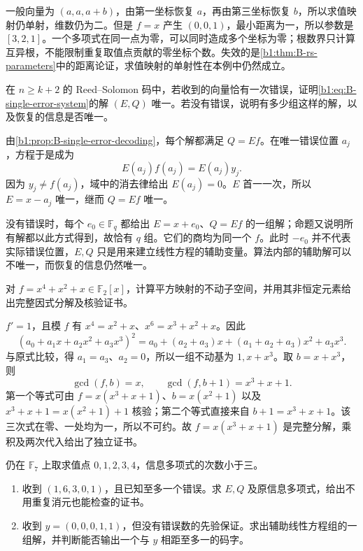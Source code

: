 \begin{solution}
	一般向量为 \((a,a,a+b)\)，由第一坐标恢复 \(a\)，再由第三坐标恢复 \(b\)，所以求值映射仍单射，维数仍为二。但是 \(f=x\) 产生 \((0,0,1)\)，最小距离为一，所以参数是 \([3,2,1]\)。一个多项式在同一点为零，可以同时造成多个坐标为零；根数界只计算互异根，不能限制重复取值点贡献的零坐标个数。失效的是\cref{b1:thm:B-rs-parameters}中的距离论证，求值映射的单射性在本例中仍然成立。
\end{solution}

\begin{exercise}\label{b1:ex:B-decoder-uniqueness}
	在 \(n\geq k+2\) 的 Reed–Solomon 码中，若收到的向量恰有一次错误，证明\eqref{b1:eq:B-single-error-system}的解 \((E,Q)\) 唯一。若没有错误，说明有多少组这样的解，以及恢复的信息是否唯一。
\end{exercise}

\begin{solution}
	由\cref{b1:prop:B-single-error-decoding}，每个解都满足 \(Q=Ef\)。在唯一错误位置 \(a_j\)，方程于是成为
	\[
		E(a_j)f(a_j)=E(a_j)y_j.
	\]
	因为 \(y_j\ne f(a_j)\)，域中的消去律给出 \(E(a_j)=0\)。\(E\) 首一一次，所以 \(E=x-a_j\) 唯一，继而 \(Q=Ef\) 唯一。

	没有错误时，每个 \(e_0\in\mathbb F_q\) 都给出 \(E=x+e_0\)、\(Q=Ef\) 的一组解；命题又说明所有解都以此方式得到，故恰有 \(q\) 组。它们的商均为同一个 \(f\)。此时 \(-e_0\) 并不代表实际错误位置，\(E,Q\) 只是用来建立线性方程的辅助变量。算法内部的辅助解可以不唯一，而恢复的信息仍然唯一。
\end{solution}

\begin{exercise}\label{b1:ex:B-factor-certificate}
	对 \(f=x^4+x^2+x\in\mathbb F_2[x]\)，计算平方映射的不动子空间，并用其非恒定元素给出完整因式分解及核验证书。
\end{exercise}

\begin{solution}
	\(f'=1\)，且模 \(f\) 有 \(x^4=x^2+x\)、\(x^6=x^3+x^2+x\)。因此
	\[
		\left(a_0+a_1x+a_2x^2+a_3x^3\right)^2 =a_0+(a_2+a_3)x+(a_1+a_2+a_3)x^2+a_3x^3.
	\]
	与原式比较，得 \(a_1=a_3\)、\(a_2=0\)，所以一组不动基为 \(1,x+x^3\)。取 \(b=x+x^3\)，则
	\[
		\gcd(f,b)=x,\qquad \gcd(f,b+1)=x^3+x+1.
	\]
	第一个等式可由 \(f=x(x^3+x+1)\)、\(b=x(x^2+1)\) 以及 \(x^3+x+1=x(x^2+1)+1\) 核验；第二个等式直接来自 \(b+1=x^3+x+1\)。该三次式在零、一处均为一，所以不可约。故 \(f=x(x^3+x+1)\) 是完整分解，乘积及两次代入给出了独立证书。
\end{solution}

\begin{exercise}\label{b1:ex:B-decoding-certificate}
	仍在 \(\mathbb F_7\) 上取求值点 \(0,1,2,3,4\)，信息多项式的次数小于三。
	\begin{enumerate}
		\item 收到 \((1,6,3,0,1)\)，且已知至多一个错误。求 \(E,Q\) 及原信息多项式，给出不用重复消元也能检查的证书。
		\item 收到 \(y=(0,0,0,1,1)\)，但没有错误数的先验保证。求出辅助线性方程组的一组解，并判断能否输出一个与 \(y\) 相距至多一的码字。
	\end{enumerate}
\end{exercise}

